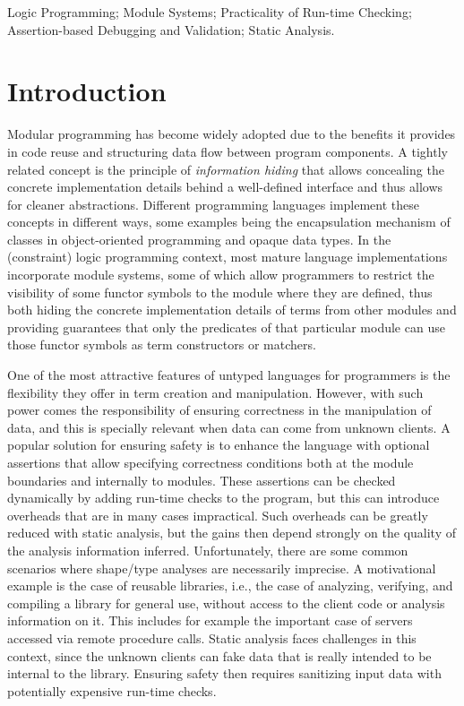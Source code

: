 \documentclass{llncs}
\newcommand{\finalcompression}[1]{\vspace*{#1}}
\begin{document}
\finalcompression{-4mm}
\begin{keywords} Logic Programming; Module Systems;
  Practicality of Run-time Checking; Assertion-based
  Debugging and Validation; Static Analysis.
\end{keywords}



\finalcompression{-3mm}
\section{Introduction}


Modular programming has become widely adopted
due to the benefits it provides
in code reuse and
structuring data flow between program components.
%
A tightly related concept is the principle of \emph{information hiding}
that allows concealing the concrete implementation details behind a
well-defined interface and thus allows for cleaner abstractions.
%
Different programming languages implement these concepts in different
ways, some examples being the encapsulation mechanism of classes in
object-oriented programming and opaque data types.
%
In the (constraint) logic programming context, most mature language
implementations incorporate module systems,
%
some of which allow programmers to restrict the visibility of some
functor symbols
%
to the module where they are defined, thus both hiding the concrete
implementation details of terms from other modules and providing
guarantees that only the predicates of that particular module can use
those functor symbols as term constructors or matchers.


One of the most attractive features of untyped languages for
programmers is the flexibility they offer in term creation and
manipulation.  However, with such power comes the responsibility of
ensuring correctness in the manipulation of data, and this is
specially relevant when data can come from unknown clients.
%
A popular solution for ensuring safety is to enhance the language with
optional assertions that allow specifying correctness conditions both
at the module boundaries and internally to modules.  These assertions
can be checked dynamically by adding run-time checks to the program,
but this can
introduce overheads that are in many cases
impractical.
%
Such overheads can be
greatly reduced with static analysis, but the gains then depend
strongly on the quality of the analysis information inferred.
%
Unfortunately, there are some common scenarios where shape/type analyses
are necessarily imprecise.
%
A motivational example is the case of reusable libraries, i.e., the case
of analyzing, verifying, and compiling a library for general use,
without access to the client code or analysis information on it.
%
This includes for example the important case of servers accessed via
remote procedure calls.
%
Static analysis faces
challenges in this context, since the unknown clients can fake data
that is really intended to be internal to the library.
%
Ensuring safety then requires sanitizing input data with
potentially expensive run-time checks.
\end{document}
